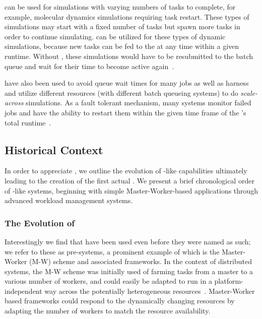 \documentclass{sig-alternate}
\begin{document}
  
  
\pilotjobs can be used for  simulations
 with varying numbers of tasks to complete, for example,
molecular dynamics simulations requiring task restart. These types of 
 simulations may start with a fixed number of tasks but spawn 
 more tasks in order to continue simulating. \pilotjobs can be
utilized for these types of dynamic simulations, because 
new tasks can be fed to the \pilot at any time within a given 
runtime. Without \pilotjobs, these simulations would have to 
be resubmitted to the batch queue and wait for their time
to become active again~\cite{luckow2009adaptive}.

\pilotjobs have also been used to avoid queue wait times for many jobs
as well as harness and utilize different resources (with different
batch queueing systems) to do \textit{scale-across} simulations.
As a fault tolerant mechanism, many \pilotjob systems monitor
failed jobs and have the ability to restart them within the given 
time frame of the \pilotjob's total runtime~\cite{1742-6596-219-6-062049,condor-g,nilsson2011atlas}. 

\subsection{Historical Context}

In order to appreciate \pilotjobs, we outline the evolution of
\pilot-like capabilities ultimately leading to the creation of the
first actual \pilotjob. We present a brief chronological order of
\pilotjob-like systems, beginning with simple Master-Worker-based
applications through advanced workload management systems.


\subsubsection*{The Evolution of \pilotjobs} 

Interestingly we find that \pilotjobs have been used even before they
were named as such; we refer to these as pre-\pilotjob systems, a
prominent example of which is the Master-Worker (M-W) scheme and
associated frameworks.  In the context of distributed systems, the M-W
scheme was initially used of farming tasks from a master to a various
number of workers, and could easily be adapted to run in a
platform-independent way across the potentially heterogeneous
resources~\cite{masterworker, Goux00anenabling}. Master-Worker based
frameworks could respond to the dynamically changing resources by
adapting the number of workers to match the resource availability.
\end{document}
